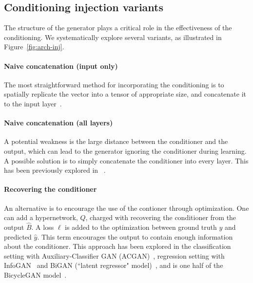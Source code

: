 \subsection{Conditioning injection variants}

The structure of the generator plays a critical role in the effectiveness of the conditioning. We systematically explore several variants, as illustrated in Figure~\ref{fig:arch-inj}.

\paragraph{Naive concatenation (input only)} The most straightforward method for incorporating the conditioning is to spatially replicate the vector into a tensor of appropriate size, and concatenate it to the input layer~\cite{XX,XX}.

\paragraph{Naive concatenation (all layers)} A potential weakness is the large distance between the conditioner and the output, which can lead to the generator ignoring the conditioner during learning. A possible solution is to simply concatenate the conditioner into every layer. This has been previously explored in ~\cite{zhu2017toward}.

\paragraph{Recovering the conditioner} An alternative is to encourage the use of the contioner through optimization. One can add a hypernetwork, $Q$, charged with recovering the conditioner from the output $\widehat{B}$. A loss $\ell$ is added to the optimization between ground truth $y$ and predicted $\widehat{y}$. This term encourages the output to contain enough information about the conditioner. This approach has been explored in the classification setting with Auxiliary-Classifier GAN (ACGAN)~\cite{XX}, regression setting with InfoGAN~\cite{XX} and BiGAN (``latent regressor" model)~\cite{XX}, and is one half of the BicycleGAN model~\cite{zhu2017toward}.


